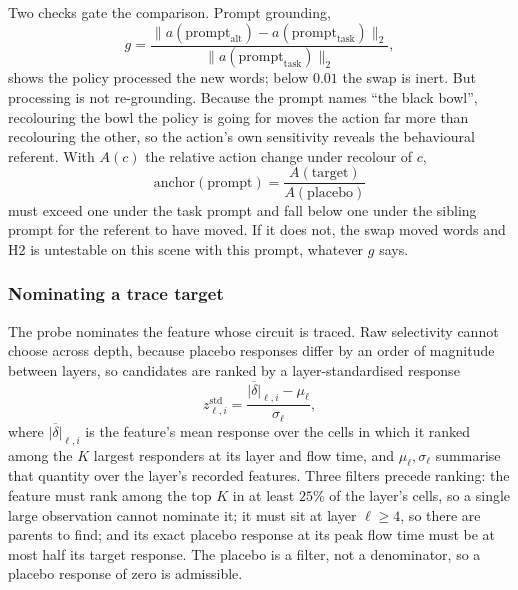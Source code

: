 Two checks gate the comparison. Prompt grounding,
\begin{equation}
g = \frac{\lVert a(\mathrm{prompt}_{\mathrm{alt}}) - a(\mathrm{prompt}_{\mathrm{task}})\rVert_2}
         {\lVert a(\mathrm{prompt}_{\mathrm{task}})\rVert_2},
\label{eq:grounding}
\end{equation}
shows the policy processed the new words; below $0.01$ the swap is inert. But
processing is not re-grounding. Because the prompt names ``the black bowl'',
recolouring the bowl the policy is going for moves the action far more than
recolouring the other, so the action's own sensitivity reveals the behavioural
referent. With $A(c)$ the relative action change under recolour of $c$,
\begin{equation}
\mathrm{anchor}(\mathrm{prompt}) = \frac{A(\mathrm{target})}{A(\mathrm{placebo})}
\label{eq:anchor}
\end{equation}
must exceed one under the task prompt and fall below one under the sibling
prompt for the referent to have moved. If it does not, the swap moved words and
H2 is untestable on this scene with this prompt, whatever $g$ says.

\subsubsection{Nominating a trace target}
\label{sec:zscore}

The probe nominates the feature whose circuit is traced. Raw selectivity cannot
choose across depth, because placebo responses differ by an order of magnitude
between layers, so candidates are ranked by a layer-standardised response
\begin{equation}
z^{\mathrm{std}}_{\ell,i}
=
\frac{\overline{|\delta|}_{\ell,i}-\mu_\ell}{\sigma_\ell},
\label{eq:zstd}
\end{equation}
where $\overline{|\delta|}_{\ell,i}$ is the feature's mean response over the
cells in which it ranked among the $K$ largest responders at its layer and flow
time, and $\mu_\ell,\sigma_\ell$ summarise that quantity over the layer's
recorded features. Three filters precede ranking: the feature must rank among
the top $K$ in at least $25\%$ of the layer's cells, so a single large
observation cannot nominate it; it must sit at layer $\ell\ge4$, so there are
parents to find; and its exact placebo response at its peak flow time must be
at most half its target response. The placebo is a filter, not a denominator,
so a placebo response of zero is admissible.

